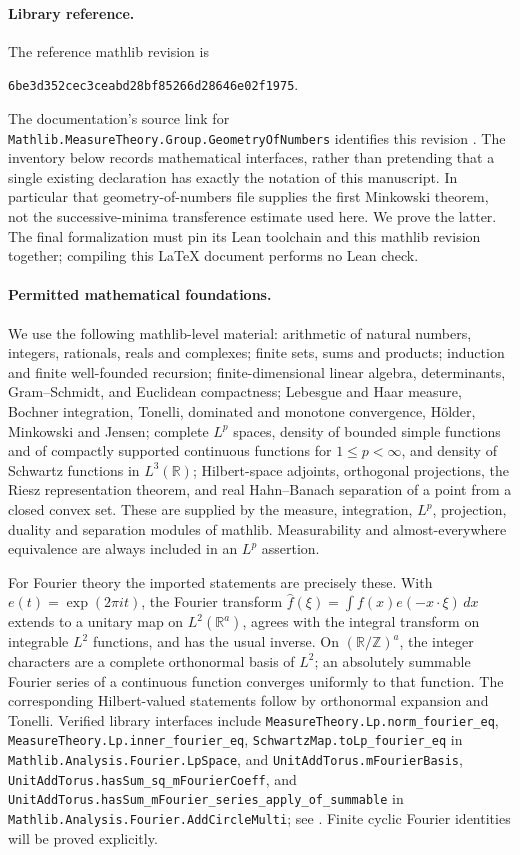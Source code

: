 \documentclass[11pt]{article}
\theoremstyle{definition}
\newcommand{\R}{\mathbb R}
\newcommand{\Z}{\mathbb Z}
\numberwithin{equation}{section}
\begin{document}
\paragraph{Library reference.}
The reference mathlib revision is
\begin{center}\small\texttt{6be3d352cec3ceabd28bf85266d28646e02f1975}.\end{center}
The documentation's source link for \nolinkurl{Mathlib.MeasureTheory.Group.GeometryOfNumbers} identifies this revision \cite{mathlibGeometry}. The inventory below records mathematical interfaces, rather than pretending that a single existing declaration has exactly the notation of this manuscript. In particular that geometry-of-numbers file supplies the first Minkowski theorem, not the successive-minima transference estimate used here. We prove the latter. The final formalization must pin its Lean toolchain and this mathlib revision together; compiling this \LaTeX{} document performs no Lean check.

\paragraph{Permitted mathematical foundations.}
We use the following mathlib-level material: arithmetic of natural numbers, integers, rationals, reals and complexes; finite sets, sums and products; induction and finite well-founded recursion; finite-dimensional linear algebra, determinants, Gram--Schmidt, and Euclidean compactness; Lebesgue and Haar measure, Bochner integration, Tonelli, dominated and monotone convergence, H\"older, Minkowski and Jensen; complete $L^p$ spaces, density of bounded simple functions and of compactly supported continuous functions for $1\le p<\infty$, and density of Schwartz functions in $L^3(\R)$; Hilbert-space adjoints, orthogonal projections, the Riesz representation theorem, and real Hahn--Banach separation of a point from a closed convex set. These are supplied by the measure, integration, $L^p$, projection, duality and separation modules of mathlib. Measurability and almost-everywhere equivalence are always included in an $L^p$ assertion.

For Fourier theory the imported statements are precisely these. With $e(t)=\exp(2\pi it)$, the Fourier transform $\widehat f(\xi)=\int f(x)e(-x\cdot\xi)\,dx$ extends to a unitary map on $L^2(\R^a)$, agrees with the integral transform on integrable $L^2$ functions, and has the usual inverse. On $(\R/\Z)^a$, the integer characters are a complete orthonormal basis of $L^2$; an absolutely summable Fourier series of a continuous function converges uniformly to that function. The corresponding Hilbert-valued statements follow by orthonormal expansion and Tonelli. Verified library interfaces include \nolinkurl{MeasureTheory.Lp.norm_fourier_eq}, \nolinkurl{MeasureTheory.Lp.inner_fourier_eq}, \nolinkurl{SchwartzMap.toLp_fourier_eq} in \nolinkurl{Mathlib.Analysis.Fourier.LpSpace}, and \nolinkurl{UnitAddTorus.mFourierBasis}, \nolinkurl{UnitAddTorus.hasSum_sq_mFourierCoeff}, and \nolinkurl{UnitAddTorus.hasSum_mFourier_series_apply_of_summable} in \nolinkurl{Mathlib.Analysis.Fourier.AddCircleMulti}; see \cite{mathlibLp,mathlibTorus}. Finite cyclic Fourier identities will be proved explicitly.
\end{document}

